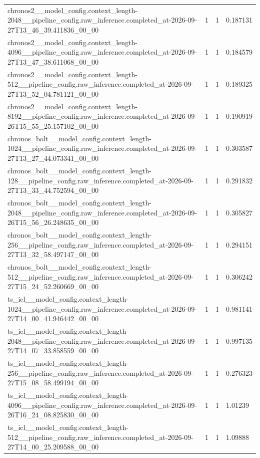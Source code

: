 \begin{tabular}{llll}
chronos2\_\_model\_config.context\_length-2048\_\_pipeline\_config.raw\_inference.completed\_at-2026-09-27T13\_46\_39.411836\_00\_00 & 1 & 1 & 0.187131 \\
chronos2\_\_model\_config.context\_length-4096\_\_pipeline\_config.raw\_inference.completed\_at-2026-09-27T13\_47\_38.611068\_00\_00 & 1 & 1 & 0.184579 \\
chronos2\_\_model\_config.context\_length-512\_\_pipeline\_config.raw\_inference.completed\_at-2026-09-27T13\_52\_04.781121\_00\_00 & 1 & 1 & 0.189325 \\
chronos2\_\_model\_config.context\_length-8192\_\_pipeline\_config.raw\_inference.completed\_at-2026-09-26T15\_55\_25.157102\_00\_00 & 1 & 1 & 0.190919 \\
chronos\_bolt\_\_model\_config.context\_length-1024\_\_pipeline\_config.raw\_inference.completed\_at-2026-09-27T13\_27\_44.073341\_00\_00 & 1 & 1 & 0.303587 \\
chronos\_bolt\_\_model\_config.context\_length-128\_\_pipeline\_config.raw\_inference.completed\_at-2026-09-27T13\_33\_44.752594\_00\_00 & 1 & 1 & 0.291832 \\
chronos\_bolt\_\_model\_config.context\_length-2048\_\_pipeline\_config.raw\_inference.completed\_at-2026-09-26T15\_56\_26.248635\_00\_00 & 1 & 1 & 0.305827 \\
chronos\_bolt\_\_model\_config.context\_length-256\_\_pipeline\_config.raw\_inference.completed\_at-2026-09-27T13\_32\_58.497147\_00\_00 & 1 & 1 & 0.294151 \\
chronos\_bolt\_\_model\_config.context\_length-512\_\_pipeline\_config.raw\_inference.completed\_at-2026-09-27T15\_24\_52.260669\_00\_00 & 1 & 1 & 0.306242 \\
ts\_icl\_\_model\_config.context\_length-1024\_\_pipeline\_config.raw\_inference.completed\_at-2026-09-27T14\_00\_41.946442\_00\_00 & 1 & 1 & 0.981141 \\
ts\_icl\_\_model\_config.context\_length-2048\_\_pipeline\_config.raw\_inference.completed\_at-2026-09-27T14\_07\_33.858559\_00\_00 & 1 & 1 & 0.997135 \\
ts\_icl\_\_model\_config.context\_length-256\_\_pipeline\_config.raw\_inference.completed\_at-2026-09-27T15\_08\_58.499194\_00\_00 & 1 & 1 & 0.276323 \\
ts\_icl\_\_model\_config.context\_length-4096\_\_pipeline\_config.raw\_inference.completed\_at-2026-09-26T16\_24\_08.825830\_00\_00 & 1 & 1 & 1.01239 \\
ts\_icl\_\_model\_config.context\_length-512\_\_pipeline\_config.raw\_inference.completed\_at-2026-09-27T14\_00\_25.209588\_00\_00 & 1 & 1 & 1.09888 \\

\end{tabular}
